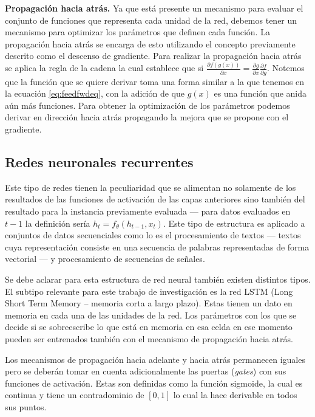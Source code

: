 \textbf{Propagación hacia atrás.} Ya que está presente un mecanismo para evaluar el conjunto de funciones que representa cada unidad de la red, debemos tener un mecanismo para optimizar los parámetros que definen cada función. La propagación hacia atrás se encarga de esto utilizando el concepto previamente descrito como el descenso de gradiente. Para realizar la propagación hacia atrás se aplica la regla de la cadena la cual establece que si $\frac{\partial f(g(x))}{\partial x} = \frac{\partial g}{\partial x} \frac{\partial f}{\partial g}$. Notemos que la función que se quiere derivar toma una forma similar a la que tenemos en la ecuación \ref{eq:feedfwdeq}, con la adición de que $g(x)$ es una función que anida aún más funciones. Para obtener la optimización de los parámetros podemos derivar en dirección hacia atrás propagando la mejora que se propone con el gradiente.

\subsection{Redes neuronales recurrentes}



Este tipo de redes tienen la peculiaridad que se alimentan no solamente de los resultados de las funciones de activación de las capas anteriores sino también del resultado para la instancia previamente evaluada --- para datos evaluados en $t - 1$ la definición sería $h_t = f_{\theta}(h_{t-1}, x_t)$. Este tipo de estructura es aplicado a conjuntos de datos secuenciales como lo es el procesamiento de textos --- textos cuya representación consiste en una secuencia de palabras representadas de forma vectorial --- y procesamiento de secuencias de señales.

Se debe aclarar para esta estructura de red neural también existen distintos tipos. El subtipo relevante para este trabajo de investigación es la red LSTM (Long Short Term Memory -- memoria corta a largo plazo). Estas tienen un dato en memoria en cada una de las unidades de la red. Los parámetros con los que se decide si se sobreescribe lo que está en memoria en esa celda en ese momento pueden ser entrenados también con el mecanismo de propagación hacia atrás.

Los mecanismos de propagación hacia adelante y hacia atrás permanecen iguales pero se deberán tomar en cuenta adicionalmente las puertas (\textit{gates}) con sus funciones de activación. Estas son definidas como la función sigmoide, la cual es continua y tiene un contradominio de $[0,1]$ lo cual la hace derivable en todos sus puntos.

